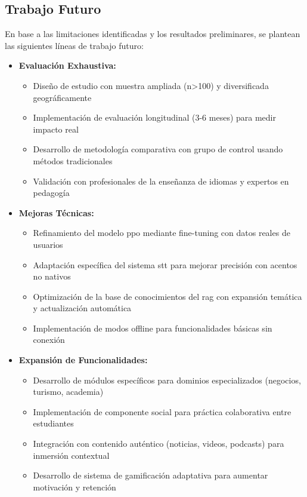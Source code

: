 \subsection{Trabajo Futuro}

En base a las limitaciones identificadas y los resultados preliminares, se plantean las siguientes líneas de trabajo futuro:

\begin{itemize}
    \item \textbf{Evaluación Exhaustiva:}
    \begin{itemize}
        \item Diseño de estudio con muestra ampliada (n>100) y diversificada geográficamente
        \item Implementación de evaluación longitudinal (3-6 meses) para medir impacto real
        \item Desarrollo de metodología comparativa con grupo de control usando métodos tradicionales
        \item Validación con profesionales de la enseñanza de idiomas y expertos en pedagogía
    \end{itemize}

    \item \textbf{Mejoras Técnicas:}
    \begin{itemize}
        \item Refinamiento del modelo \gls{ppo} mediante fine-tuning con datos reales de usuarios
        \item Adaptación específica del sistema \gls{stt} para mejorar precisión con acentos no nativos
        \item Optimización de la base de conocimientos del \gls{rag} con expansión temática y actualización automática
        \item Implementación de modos offline para funcionalidades básicas sin conexión
    \end{itemize}

    \item \textbf{Expansión de Funcionalidades:}
    \begin{itemize}
        \item Desarrollo de módulos específicos para dominios especializados (negocios, turismo, academia)
        \item Implementación de componente social para práctica colaborativa entre estudiantes
        \item Integración con contenido auténtico (noticias, videos, podcasts) para inmersión contextual
        \item Desarrollo de sistema de gamificación adaptativa para aumentar motivación y retención
    \end{itemize}
\end{itemize}

